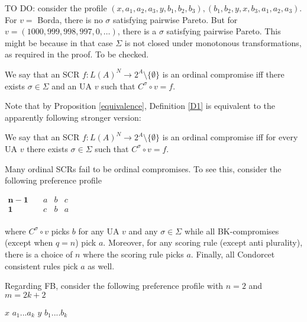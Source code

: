 \documentclass[version=3.21, pagesize, notitlepage, twoside=off, bibliography=totoc, DIV=calc, fontsize=11.5pt, a4paper]{scrartcl}
\begin{document}
TO DO: consider the profile $(x, a_1, a_2, a_3, y, b_1, b_2, b_3), (b_1, b_2, y, x, b_3, a_1, a_2, a_3)$. For $v = $ Borda, there is no $\sigma$ satisfying pairwise Pareto. But for $v = (1000, 999, 998, 997, 0, …)$, there is a $\sigma$ satisfying pairwise Pareto. This might be because in that case $\Sigma$ is not closed under monotonous transformations, as required in the proof. To be checked.

\begin{definition}
\label{D1} \bigskip We say that an SCR $f:L(A)^{N}\rightarrow 2^{A} \setminus \{\emptyset \}$ is an ordinal compromise iff there exists $\sigma \in \Sigma $ and an UA $v$ such that $C^{\sigma }\circ v=f$.
\end{definition}

Note that by Proposition \ref{equivalence}, Definition \ref{D1} is equivalent to the apparently following stronger version:

\begin{definition}
\label{D2} We say that an SCR $f:L(A)^{N}\rightarrow 2^{A} \setminus \{\emptyset \}$ is an ordinal compromise iff for every UA $v$ there exists $\sigma \in \Sigma $ such that $C^{\sigma }\circ v=f$.
\end{definition}

\begin{example}
	\label{ex:qeqn}
Many ordinal SCRs fail to be ordinal compromises. To see this, consider the following preference profile

\begin{center}
	$
	\begin{array}{cccc}
	\mathbf{n-1} \quad &a&b&c\\
	\mathbf{1} \quad &c&b&a\\
	\end{array}
	$
\end{center}

where $C^{\sigma }\circ v$ picks $b$ for any UA $v$ and any $\sigma \in \Sigma $ while all BK-compromises (except when $q=n$) pick $a$. Moreover, for any scoring rule (except anti plurality), there is a choice of $n$ where the scoring rule picks $a$. Finally, all Condorcet consistent rules pick $a$ as well.
\end{example}

Regarding FB, consider the following preference profile with $n=2$ and $m=2k+2$

\bigskip

$x$ $a_{1}...a_{k}$ $y$ $b_{1}....b_{k}$
\end{document}
